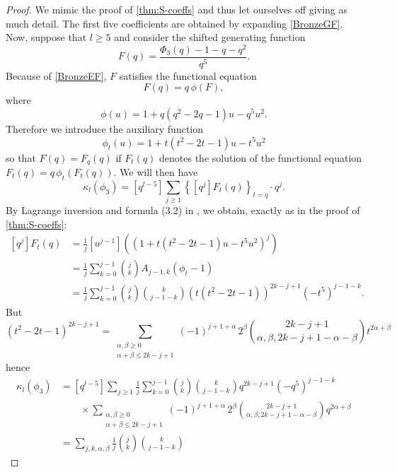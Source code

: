 \documentclass[11pt,reqno]{amsart}
\theoremstyle{plain}
\theoremstyle{definition}
\numberwithin{figure}{section}
\numberwithin{table}{section}
\numberwithin{equation}{section}
\newcommand\al{\alpha}
\newcommand\be{\beta}
\newcommand\ka{\kappa}
\let\fr=\frac
\begin{document}
\begin{proof}
We mimic the proof of \cref{thm:S-coeffs} and thus let ourselves off giving as much detail. The first five coefficients are obtained by expanding \eqref{BronzeGF}. Now, suppose that $l≥5$ and consider  the shifted generating function 
\begin{equation*}
F(q)=\fr{\Phi_3(q)-1-q-q^2}{q^5}.
\end{equation*} 
Because of \eqref{BronzeEF}, $F$ satisfies the functional equation
\begin{equation*}
F(q)=q\,\phi(F),
\end{equation*}
where 
\begin{equation*}
\phi(u)=1+q(q^2-2q-1)u-q^5 u^2.
\end{equation*}
Therefore we introduce the auxiliary function 
\begin{equation*}
\phi_t(u)=1+t(t^2-2t-1)u-t^5 u^2
\end{equation*}
so that $F(q)=F_q(q)$ if $F_t(q)$ denotes the solution of the functional equation $F_t(q)=q\,\phi_t(F_t(q))$. We will then have
\begin{equation*}
\ka_l(\phi_3)=[q^{l-5}]\sum_{j≥1}\left\{[q^j]F_t(q)\right\}_{t=q}\cdot q^j.
\end{equation*}
By Lagrange inversion and formula (3.2) in \cite{OSullivan22}, we obtain, exactly as in the proof of \cref{thm:S-coeffs}:
\begin{align}\label{rox}
[q^j]F_t(q)&=\fr 1{j}[u^{j-1}]\left((1+t(t^2-2t-1)u-t^5 u^2)^j\right)\\
&=\fr 1{j}\sum_{k=0}^{j-1}\binom{j}{k}A_{j-1,k}(\phi_t-1)\\
&=\fr 1{j}\sum_{k=0}^{j-1}\binom{j}{k}\binom{k}{j-1-k}\left(t(t^2-2t-1)\right)^{2k-j+1}(-t^5)^{j-1-k}.
\end{align}
But
\begin{equation*}
(t^2-2t-1)^{2k-j+1}=\sum_{\substack{\al,\be≥0\\ \al+\be≤2k-j+1}}
(-1)^{j+1+\al}\,2^\be \binom{2k-j+1}{\al,\be,2k-j+1-\al-\be}t^{2\al+\be}
\end{equation*}
hence
\begin{align*}
\ka_l(\phi_3)&=[q^{l-5}]\sum_{j≥1}\fr 1{j}\sum_{k=0}^{j-1}\binom{j}{k}\binom{k}{j-1-k}
q^{2k-j+1}(-q^5)^{j-1-k}\\
&\qquad\times\sum_{\substack{\al,\be≥0\\ \al+\be≤2k-j+1}}
(-1)^{j+1+\al}\,2^\be \binom{2k-j+1}{\al,\be,2k-j+1-\al-\be}q^{2\al+\be}\\
&=\sum_{j,k,\al,\be}\fr 1{j}\binom{j}{k}\binom{k}{j-1-k}

\end{align*}
\end{proof}
\end{document}
